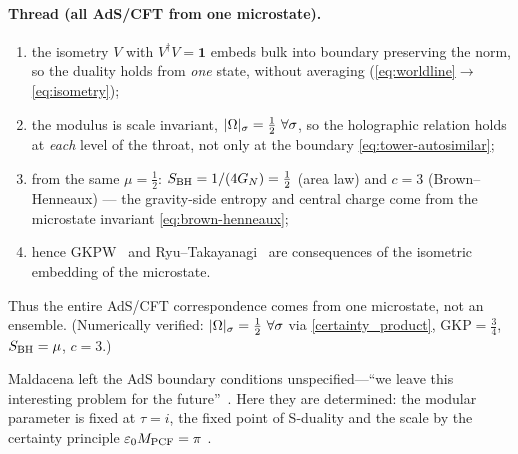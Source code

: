 \paragraph{Thread (all AdS/CFT from one microstate).}
\begin{enumerate}
  \item the isometry $V$ with $V^{\dagger}V=\mathbf 1$ embeds bulk into boundary preserving the norm,
        so the duality holds from \emph{one} state, without averaging
        (\eqref{eq:worldline}$\to$\eqref{eq:isometry});
  \item the modulus is scale invariant, $|\Omega|_{\sigma}=\tfrac12\ \forall\sigma$, so the holographic
        relation holds at \emph{each} level of the throat, not only at the boundary
        \eqref{eq:tower-autosimilar};
  \item from the same $\mu=\tfrac12$: $S_{\mathrm{BH}}=1/(4G_{N})=\tfrac12$ (area law) and $c=3$ (Brown--Henneaux)
        --- the gravity-side entropy and central charge come from the microstate invariant
        \eqref{eq:brown-henneaux};
  \item hence GKPW~\cite{GKP98,Witten98} and Ryu--Takayanagi~\cite{RyuTakayanagi06} are consequences of the isometric embedding of the microstate.
\end{enumerate}
Thus the entire AdS/CFT correspondence comes from one microstate, not an ensemble. (Numerically verified: $|\Omega|_{\sigma}=\tfrac12\ \forall\sigma$ via \eqref{certainty_product},
$\mathrm{GKP}=\tfrac34$, $S_{\mathrm{BH}}=\mu$, $c=3$.)

Maldacena left the AdS boundary conditions unspecified---``we leave this interesting problem
for the future''~\cite{Maldacena98}. Here they are determined: the modular parameter is fixed
at $\tau=i$, the fixed point of S-duality
and the scale by the
certainty principle $\varepsilon_0 M_{\mathrm{PCF}}=\pi$ .


